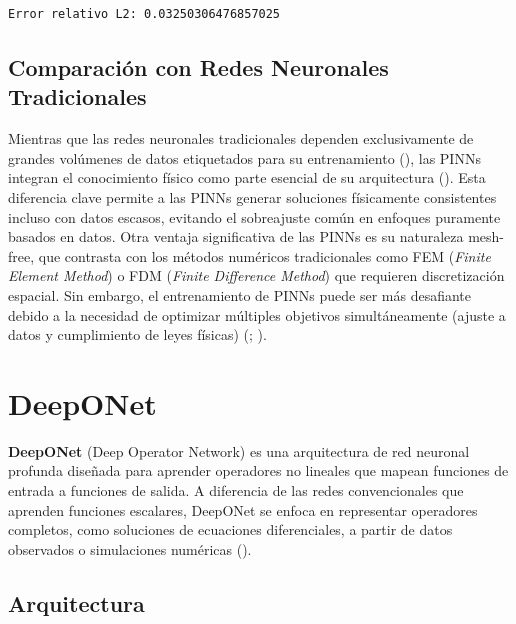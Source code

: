 \documentclass[
  spanish,
  us-letterpaper,
]{scrreprt}
\theoremstyle{definition}
\theoremstyle{plain}
\theoremstyle{remark}
\begin{document}
\begin{verbatim}
Error relativo L2: 0.03250306476857025
\end{verbatim}

\section{Comparación con Redes Neuronales
Tradicionales}\label{comparaciuxf3n-con-redes-neuronales-tradicionales}

Mientras que las redes neuronales tradicionales dependen exclusivamente
de grandes volúmenes de datos etiquetados para su entrenamiento
(), las PINNs
integran el conocimiento físico como parte esencial de su arquitectura
(). Esta diferencia
clave permite a las PINNs generar soluciones físicamente consistentes
incluso con datos escasos, evitando el sobreajuste común en enfoques
puramente basados en datos. Otra ventaja significativa de las PINNs es
su naturaleza mesh-free, que contrasta con los métodos numéricos
tradicionales como FEM (\emph{Finite Element Method}) o FDM
(\emph{Finite Difference Method}) que requieren discretización espacial.
Sin embargo, el entrenamiento de PINNs puede ser más desafiante debido a
la necesidad de optimizar múltiples objetivos simultáneamente (ajuste a
datos y cumplimiento de leyes físicas)
(;
).

\chapter{DeepONet}\label{deeponet}

\textbf{DeepONet} (Deep Operator Network) es una arquitectura de red
neuronal profunda diseñada para aprender operadores no lineales que
mapean funciones de entrada a funciones de salida. A diferencia de las
redes convencionales que aprenden funciones escalares, DeepONet se
enfoca en representar operadores completos, como soluciones de
ecuaciones diferenciales, a partir de datos observados o simulaciones
numéricas ().

\section{Arquitectura}\label{arquitectura}
\end{document}
